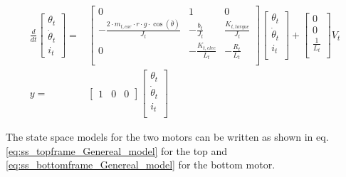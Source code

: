 \documentclass[../../main]{subfiles}
\begin{document}
\begin{equation}
      \label{eq:topframe_mech_linearized}
      \begin{split}
      \frac{d}{dt}
    \begin{bmatrix}
        \theta_t \\
        \dot \theta_t \\
        i_t
    \end{bmatrix}
    =&
    \begin{bmatrix}
        0 & 1               & 0             \\
        -\frac{2\cdot m_{t,cor}\cdot r \cdot g \cdot \cos(\bar \theta)}{J_t} & -\frac{b_t}{J_t}    & \frac{K_{t,torque}}{J_t} \\
        0 & -\frac{K_{t,elec}}{L_t}  & -\frac{R_t}{L_t}  \\
    \end{bmatrix}
    \begin{bmatrix}
        \theta_t \\
        \dot \theta_t \\
        i_t \\
    \end{bmatrix}
    +
    \begin{bmatrix}
        0 \\
        0 \\
        \frac{1}{L_t} \\
    \end{bmatrix}
    V_t
\\
      y =&
    \begin{bmatrix}
        1 & 0 & 0
    \end{bmatrix}
    \begin{bmatrix}
        \theta_t \\
        \dot \theta_t\\
        i_t\\
    \end{bmatrix}
    \end{split}
\end{equation}

The state space models for the two motors can be written as shown in eq. \eqref{eq:ss_topframe_Genereal_model} for the top and \eqref{eq:ss_bottomframe_Genereal_model} for the bottom motor.
\end{document}
